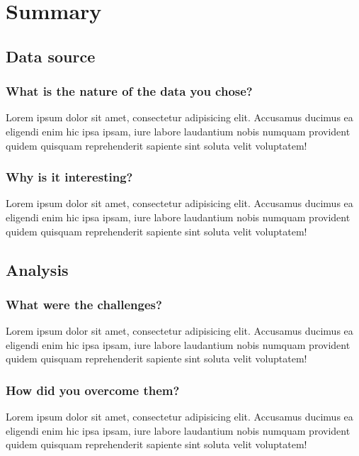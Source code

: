 \section{Summary}

\subsection{Data source}

\subsubsection{What is the nature of the data you chose?}

Lorem ipsum dolor sit amet, consectetur adipisicing elit. Accusamus ducimus ea eligendi enim hic ipsa ipsam, iure labore laudantium nobis numquam provident quidem quisquam reprehenderit sapiente sint soluta velit voluptatem!

\subsubsection{Why is it interesting?}

Lorem ipsum dolor sit amet, consectetur adipisicing elit. Accusamus ducimus ea eligendi enim hic ipsa ipsam, iure labore laudantium nobis numquam provident quidem quisquam reprehenderit sapiente sint soluta velit voluptatem!

\subsection{Analysis}

\subsubsection{What were the challenges?}

Lorem ipsum dolor sit amet, consectetur adipisicing elit. Accusamus ducimus ea eligendi enim hic ipsa ipsam, iure labore laudantium nobis numquam provident quidem quisquam reprehenderit sapiente sint soluta velit voluptatem!

\subsubsection{How did you overcome them?}

Lorem ipsum dolor sit amet, consectetur adipisicing elit. Accusamus ducimus ea eligendi enim hic ipsa ipsam, iure labore laudantium nobis numquam provident quidem quisquam reprehenderit sapiente sint soluta velit voluptatem!

